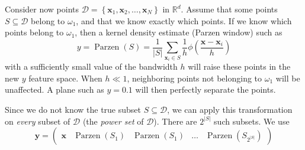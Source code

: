 \documentclass[12pt, a4paper]{article}
\newcommand{\R}{\mathbb{R}}
\newcommand{\D}{\mathcal{D}}
\newcommand{\vect}[1]{\bm{#1}}
\newcommand{\abs}[1]{\left\lvert#1\right\rvert}
\begin{document}
Consider now points $\D = \left\{ \vect{x}_1, \vect{x}_2, \dots, \vect{x}_N \right\}$ in $\R^d$.
Assume that some points $S \subseteq \D$ belong to $\omega_1$, and that we know exactly which points. 
If we know which points belong to  $\omega_1$, then a kernel density estimate  (Parzen window) such as
\begin{equation*}
	y  = \operatorname{Parzen}(S) = \frac{1}{\abs{S}}\sum_{\vect{x}_i \in S} \frac{1}{h} \phi \left( \frac{\vect{x} - \vect{x}_i}{h} \right)
\end{equation*}
with a sufficiently small value of the bandwidth $h$ will raise these points in the new $y$ feature space.
When $h \ll 1$, neighboring points not belonging to $\omega_1$ will be unaffected.
A plane such as $y = 0.1$ will then perfectly separate the points.

Since we do not know the true subset $S \subseteq \D$, we can apply this transformation on \emph{every} subset of $\D$ (the \emph{power set} of $\D$).
There are $2^{\abs{S}}$ such subsets.
We use
\begin{equation*}
	\vect{y} = 
	\begin{pmatrix}
	\vect{x} & \operatorname{Parzen}(S_1) & \operatorname{Parzen}(S_1) & \dots & \operatorname{Parzen}(S_{2^{\abs{S}}})
	\end{pmatrix}
\end{equation*}
\end{document}
